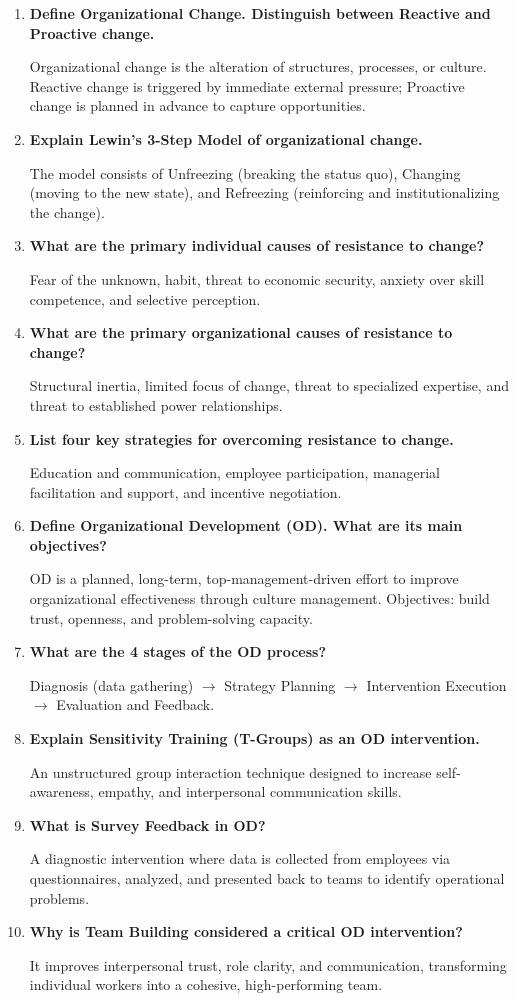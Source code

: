 \documentclass[12pt,a4paper]{article}
\newcommand{\Q}[1]{\textbf{#1}\par\noindent\ignorespaces}
\begin{document}
\begin{tcolorbox}[exambox, title={\textbf{Frequently Asked / Viva Questions}}]
\begin{enumerate}[leftmargin=*, itemsep=4pt]
  \item \Q{Define Organizational Change. Distinguish between Reactive and Proactive change.}
    Organizational change is the alteration of structures, processes, or culture. Reactive change is triggered by immediate external pressure; Proactive change is planned in advance to capture opportunities.
  
  \item \Q{Explain Lewin's 3-Step Model of organizational change.}
    The model consists of Unfreezing (breaking the status quo), Changing (moving to the new state), and Refreezing (reinforcing and institutionalizing the change).
  
  \item \Q{What are the primary individual causes of resistance to change?}
    Fear of the unknown, habit, threat to economic security, anxiety over skill competence, and selective perception.
  
  \item \Q{What are the primary organizational causes of resistance to change?}
    Structural inertia, limited focus of change, threat to specialized expertise, and threat to established power relationships.
  
  \item \Q{List four key strategies for overcoming resistance to change.}
    Education and communication, employee participation, managerial facilitation and support, and incentive negotiation.
  
  \item \Q{Define Organizational Development (OD). What are its main objectives?}
    OD is a planned, long-term, top-management-driven effort to improve organizational effectiveness through culture management. Objectives: build trust, openness, and problem-solving capacity.
  
  \item \Q{What are the 4 stages of the OD process?}
    Diagnosis (data gathering) $\to$ Strategy Planning $\to$ Intervention Execution $\to$ Evaluation and Feedback.
  
  \item \Q{Explain Sensitivity Training (T-Groups) as an OD intervention.}
    An unstructured group interaction technique designed to increase self-awareness, empathy, and interpersonal communication skills.
  
  \item \Q{What is Survey Feedback in OD?}
    A diagnostic intervention where data is collected from employees via questionnaires, analyzed, and presented back to teams to identify operational problems.
  
  \item \Q{Why is Team Building considered a critical OD intervention?}
    It improves interpersonal trust, role clarity, and communication, transforming individual workers into a cohesive, high-performing team.
\end{enumerate}
\end{tcolorbox}
\end{document}
